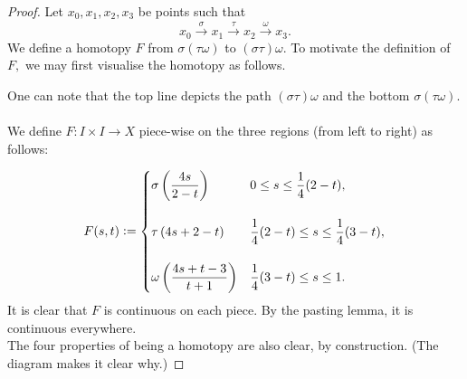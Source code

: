 \documentclass[12pt]{article}
\theoremstyle{definition}
\numberwithin{thm}{section}
\begin{document}
\begin{proof} 
	Let $x_0, x_1, x_2, x_3$ be points such that
	\begin{equation*} 
		x_0 \overset{\sigma}{\longrightarrow} x_1 \overset{\tau}{\longrightarrow} x_2 \overset{\omega}{\longrightarrow} x_3. 
	\end{equation*}
	We define a homotopy $F$ from $\sigma(\tau\omega)$ to $(\sigma\tau)\omega.$ To motivate the definition of $F,$ we may first visualise the homotopy as follows.
	\begin{center}
	\end{center}
	One can note that the top line depicts the path $(\sigma\tau)\omega$ and the bottom $\sigma(\tau\omega).$\\~\\
	We define $F:I \times I \to X$ piece-wise on the three regions (from left to right) as follows:

	\begin{equation*} 
		F(s, t) \vcentcolon= \begin{cases}
			\sigma\left(\dfrac{4s}{2 - t}\right) & 0 \le s \le \dfrac{1}{4}(2 - t) ,\\~\\
			\tau\left(4s + 2 - t\right) & \dfrac{1}{4}(2 - t) \le s \le \dfrac{1}{4}(3 - t),\\~\\
			\omega\left(\dfrac{4s + t - 3}{t + 1}\right) & \dfrac{1}{4}(3 - t) \le s \le 1.
		\end{cases}
	\end{equation*}
	It is clear that $F$ is continuous on each piece. By the pasting lemma, it is continuous everywhere.\\
	The four properties of being a homotopy are also clear, by construction. (The diagram makes it clear why.)
\end{proof}
\end{document}
